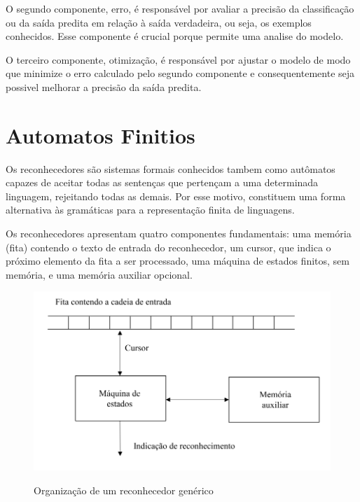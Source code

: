 O segundo componente, erro, é responsável por avaliar a precisão da classificação ou da saída predita em relação à saída verdadeira, ou seja, os exemplos conhecidos. Esse componente é crucial porque permite uma analise do modelo.


O terceiro componente, otimização, é responsável por ajustar o modelo de modo que  minimize o  erro calculado pelo segundo componente e consequentemente seja possivel melhorar a precisão da saída predita. 



\section[Automatos Finitos]{Automatos Finitios}


Os reconhecedores são sistemas formais conhecidos tambem como autômatos capazes de aceitar todas as sentenças que pertençam a uma determinada linguagem, rejeitando todas as demais. Por esse motivo, constituem uma forma alternativa às gramáticas para a representação finita de linguagens.\cite{reconhecimento}

Os reconhecedores apresentam quatro componentes fundamentais: uma memória (fita) contendo o texto de entrada do
reconhecedor, um cursor, que indica o próximo elemento da fita a ser processado, uma máquina de estados finitos, sem memória, e uma memória auxiliar opcional.


\begin{figure}[!htb]
	\centering
    \caption{Organização de um reconhecedor genérico}
	\includegraphics[scale=2]{figuras/AFD/reconhecedor.png}
	\label{fig:Organizacao de um reconhecedor generico}
\end{figure}


